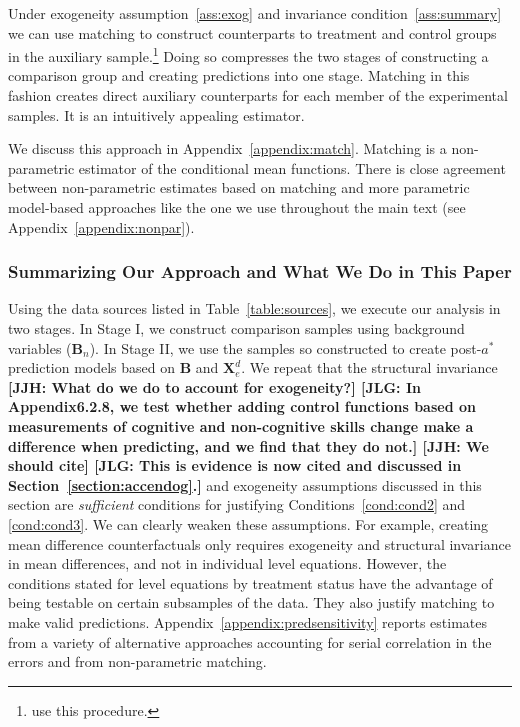 Under exogeneity assumption~\ref{ass:exog} and invariance condition~\ref{ass:summary} we can use matching to construct counterparts to treatment and control groups in the auxiliary sample.\footnote{\citet{Heckman_Ichimura_etal_1998_Econometrica} use this procedure.} Doing so compresses the two stages of constructing a comparison group and creating predictions into one stage. Matching in this fashion creates direct auxiliary counterparts for each member of the experimental samples. It is an intuitively appealing estimator.

We discuss this approach in Appendix~\ref{appendix:match}. Matching is a non-parametric estimator of the conditional mean functions. There is close agreement between non-parametric estimates based on matching and more parametric model-based approaches like the one we use throughout the main text (see  Appendix~\ref{appendix:nonpar}).

\subsubsection{Summarizing Our Approach and What We Do in This Paper}

Using the data sources listed in Table~\ref{table:sources}, we execute our analysis in two stages. In Stage I, we construct comparison samples using background variables ($\bm{B}_n$). In Stage II, we use the samples so constructed to create post-$a^\ast$ prediction models based on $\bm{B}$ and $\bm{X}^d_e$. We repeat that the structural invariance  \textbf{[JJH: What do we do to account for exogeneity?] [JLG: In Appendix6.2.8, we test whether adding control functions based on measurements of cognitive and non-cognitive skills change make a difference when predicting, and we find that they do not.] [JJH: We should cite] [JLG: This is evidence is now cited and discussed in Section~\ref{section:accendog}.]} and exogeneity assumptions discussed in this section are \emph{sufficient} conditions for justifying Conditions~\ref{cond:cond2} and \ref{cond:cond3}. We can clearly weaken these assumptions. For example, creating mean difference counterfactuals only requires exogeneity and structural invariance in mean differences, and not in individual level equations. However, the conditions stated for level equations by treatment status have the advantage of being testable on certain subsamples of the data. They also justify matching to make valid predictions.  Appendix~\ref{appendix:predsensitivity} reports estimates from a variety of alternative approaches accounting for serial correlation in the errors and from non-parametric matching. 

